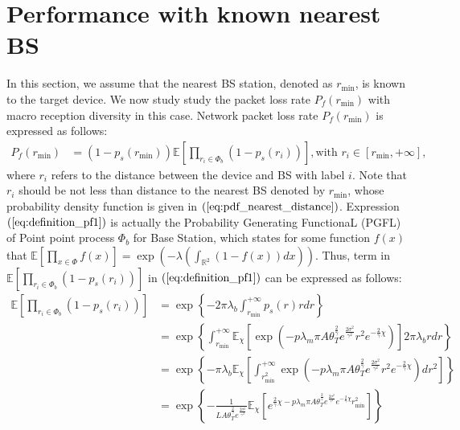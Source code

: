 \section{Performance with known nearest BS}
In this section, we assume that the nearest BS station, denoted as $r_{\text{min}}$, is known to the target device. We now study study the packet loss rate $P_{f}(r_{\text{min}})$ with macro reception diversity in this case. Network packet loss rate $P_{f}(r_{\text{min}})$ is expressed as follows:
\begin{align}
\label{eq:definition_pf1}
P_{f}(r_{\text{min}}) &= ( 1-p_s( r_{\text{min}} ) ) \mathbb{E} \left[  \prod_{r_i \in \Phi_{b}} (1-p_{s}(r_i)) \right], \text{with } r_i \in \left[ r_{\text{min}}, +\infty\right],
\end{align} 
where $r_i$ refers to the distance between the device and BS with label $i$. Note that $r_i$ should be not less than distance to the nearest BS denoted by $r_{\text{min}}$, whose probability density function is given in $(\ref{eq:pdf_nearest_distance})$. Expression $(\ref{eq:definition_pf1})$ is actually the Probability Generating FunctionaL (PGFL) of Point point process $\Phi_{b}$ for Base Station, which states for some function $f(x)$ that $\mathbb{E}\left[ \prod_{x \in \Phi}f(x) \right] = \exp(-\lambda(\int_{\mathbb{R}^2}(1-f(x))dx))$. Thus, term in $\mathbb{E} \left[  \prod_{r_i \in \Phi_{b}} (1-p_{s}(r_i)) \right]$ in $(\ref{eq:definition_pf1})$ can be expressed as follows:
\begin{align}
\mathbb{E} \left[  \prod_{r_i \in \Phi_{b}} (1-p_{s}(r_i)) \right] &= \exp\left\lbrace -2\pi \lambda_{b} \int_{r_{\text{min}}}^{+\infty} p_{s}(r)rdr \right\rbrace \nonumber\\
&= \exp\left\lbrace  \int_{r_{\text{min}}}^{+\infty} \mathbb{E}_{\chi}\left[ \exp(-p \lambda_{m} \pi A \theta_{T}^{\frac{2}{\gamma}} e^{\frac{2\sigma^2}{\gamma^2}}  r^2 e^{-\frac{2}{\gamma}\chi}) \right] 2\pi\lambda_{b} rdr  \right\rbrace \nonumber \\ 
&= \exp\left\lbrace -\pi \lambda_{b} \mathbb{E}_{\chi}\left[ \int_{r_{\text{min}}^{2}}^{+\infty}  \exp(-p \lambda_{m} \pi A \theta_{T}^{\frac{2}{\gamma}} e^{\frac{2\sigma^2}{\gamma^2}}  r^2 e^{-\frac{2}{\gamma}\chi}) dr^2 \right] \right\rbrace \nonumber\\ 
&= \exp\left\lbrace -\frac{1}{L A \theta_{T}^{\frac{2}{\gamma}} e^{\frac{2\sigma^2}{\gamma^2}} } \mathbb{E}_{\chi}\left[ e^{\frac{2}{\gamma}\chi -p \lambda_{m} \pi A \theta_{T}^{\frac{2}{\gamma}} e^{\frac{2\sigma^2}{\gamma^2}} e^{-\frac{2}{\gamma}\chi} r_{\text{min}}^2} \right]  \right\rbrace
\end{align} 

